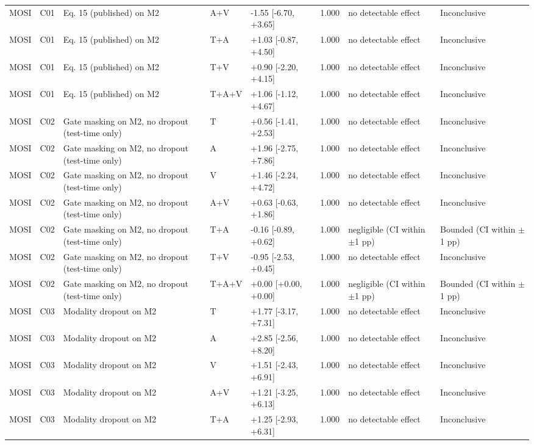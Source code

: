\begin{landscape}
{\begin{xltabular}{\linewidth}{ll>{\raggedright\arraybackslash}Xlll>{\raggedright\arraybackslash}X>{\raggedright\arraybackslash}X}
MOSI & C01 & Eq. 15 (published) on M2 & A+V & -1.55 [-6.70, +3.65] & 1.000 & no detectable effect & Inconclusive \\
MOSI & C01 & Eq. 15 (published) on M2 & T+A & +1.03 [-0.87, +4.50] & 1.000 & no detectable effect & Inconclusive \\
MOSI & C01 & Eq. 15 (published) on M2 & T+V & +0.90 [-2.20, +4.15] & 1.000 & no detectable effect & Inconclusive \\
MOSI & C01 & Eq. 15 (published) on M2 & T+A+V & +1.06 [-1.12, +4.67] & 1.000 & no detectable effect & Inconclusive \\
MOSI & C02 & Gate masking on M2, no dropout (test-time only) & T & +0.56 [-1.41, +2.53] & 1.000 & no detectable effect & Inconclusive \\
MOSI & C02 & Gate masking on M2, no dropout (test-time only) & A & +1.96 [-2.75, +7.86] & 1.000 & no detectable effect & Inconclusive \\
MOSI & C02 & Gate masking on M2, no dropout (test-time only) & V & +1.46 [-2.24, +4.72] & 1.000 & no detectable effect & Inconclusive \\
MOSI & C02 & Gate masking on M2, no dropout (test-time only) & A+V & +0.63 [-0.63, +1.86] & 1.000 & no detectable effect & Inconclusive \\
MOSI & C02 & Gate masking on M2, no dropout (test-time only) & T+A & -0.16 [-0.89, +0.62] & 1.000 & negligible (CI within $\pm$1 pp) & Bounded (CI within $\pm$1 pp) \\
MOSI & C02 & Gate masking on M2, no dropout (test-time only) & T+V & -0.95 [-2.53, +0.45] & 1.000 & no detectable effect & Inconclusive \\
MOSI & C02 & Gate masking on M2, no dropout (test-time only) & T+A+V & +0.00 [+0.00, +0.00] & 1.000 & negligible (CI within $\pm$1 pp) & Bounded (CI within $\pm$1 pp) \\
MOSI & C03 & Modality dropout on M2 & T & +1.77 [-3.17, +7.31] & 1.000 & no detectable effect & Inconclusive \\
MOSI & C03 & Modality dropout on M2 & A & +2.85 [-2.56, +8.20] & 1.000 & no detectable effect & Inconclusive \\
MOSI & C03 & Modality dropout on M2 & V & +1.51 [-2.43, +6.91] & 1.000 & no detectable effect & Inconclusive \\
MOSI & C03 & Modality dropout on M2 & A+V & +1.21 [-3.25, +6.13] & 1.000 & no detectable effect & Inconclusive \\
MOSI & C03 & Modality dropout on M2 & T+A & +1.25 [-2.93, +6.31] & 1.000 & no detectable effect & Inconclusive \\

\end{xltabular}}
\end{landscape}
